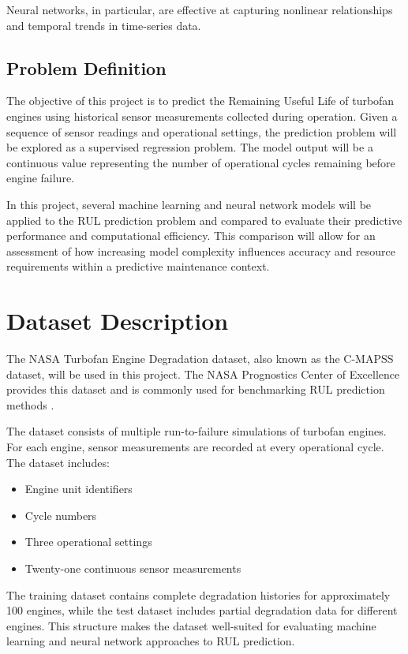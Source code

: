 \documentclass[conference]{IEEEtran}
\begin{document}
Neural networks, in particular, are effective at capturing nonlinear relationships and temporal trends in time-series data.

\subsection{Problem Definition}
The objective of this project is to predict the Remaining Useful Life of turbofan engines using historical sensor measurements collected during operation. Given a sequence of sensor readings and operational settings, the prediction problem will be explored as a supervised regression problem. The model output will be a continuous value representing the number of operational cycles remaining before engine failure.

In this project, several machine learning and neural network models will be applied to the RUL prediction problem and compared to evaluate their predictive performance and computational efficiency. This comparison will allow for an assessment of how increasing model complexity influences accuracy and resource requirements within a predictive maintenance context.

\section{Dataset Description}

The NASA Turbofan Engine Degradation dataset, also known as the C-MAPSS dataset, will be used in this project. The NASA Prognostics Center of Excellence provides this dataset and is commonly used for benchmarking RUL prediction methods \cite{ref2}\cite{ref5}.

The dataset consists of multiple run-to-failure simulations of turbofan engines. For each engine, sensor measurements are recorded at every operational cycle. The dataset includes:

\begin{itemize}
    \item Engine unit identifiers
    \item Cycle numbers
    \item Three operational settings
    \item Twenty-one continuous sensor measurements
\end{itemize}

The training dataset contains complete degradation histories for approximately 100 engines, while the test dataset includes partial degradation data for different engines. This structure makes the dataset well-suited for evaluating machine learning and neural network approaches to RUL prediction.
\end{document}
